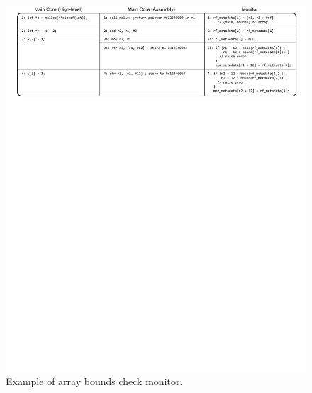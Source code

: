 % 

\begin{figure}
  \begin{center}
    \includegraphics[]{figs/example_full.pdf}
    \caption{Example of array bounds check monitor.}
    \label{fig:dropping.example_full}
    \vspace{-0.1in}
  \end{center}
\end{figure} 

